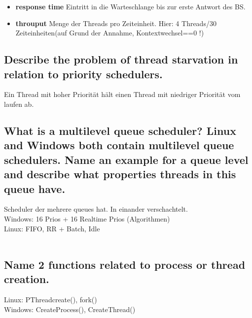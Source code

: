 \begin{itemize}
	\item \textbf{response time} Eintritt in die Warteschlange bis zur erste Antwort des BS.
	\item \textbf{throuput} Menge der Threads pro Zeiteinheit. Hier: 4 Threads/30 Zeiteinheiten(auf Grund der Annahme, Kontextwechsel==0 !)
\end{itemize}

\subsection{Describe the problem of thread starvation in relation to priority schedulers.}
Ein Thread mit hoher Priorit\"at h\"alt einen Thread mit niedriger Priorit\"at vom laufen ab.

\subsection{What is a multilevel queue scheduler? Linux and Windows both contain multilevel queue schedulers. Name an example for a queue level and describe what properties threads in this queue have.}
Scheduler der mehrere queues hat. In einander verschachtelt.\\
Windows: 16 Prios + 16 Realtime Prios (Algorithmen)\\
Linux: FIFO, RR + Batch, Idle\\
\missing\\
\unsure

\subsection{Name 2 functions related to process or thread creation.}
Linux: PThreadcreate(), fork()\\Windows: CreateProcess(), CreateThread()
